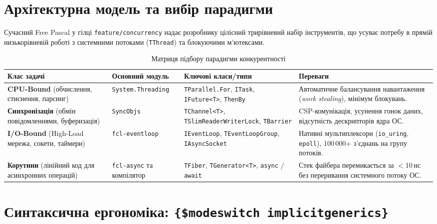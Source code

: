 \documentclass[11pt,a4paper]{article}
\begin{document}
\tableofcontents
\newpage

\section{Архітектурна модель та вибір парадигми}

Сучасний Free Pascal у гілці \texttt{feature/concurrency} надає розробнику цілісний трирівневий набір інструментів, що усуває потребу в прямій низькорівневій роботі з системними потоками (\texttt{TThread}) та блокуючими м'ютексами.

\begin{table}[h!]
\centering
\small
\begin{tabularx}{\textwidth}{p{3.2cm}p{3.5cm}p{4.2cm}X}
\toprule
\textbf{Клас задачі} & \textbf{Основний модуль} & \textbf{Ключові класи/типи} & \textbf{Переваги} \\
\midrule
\textbf{CPU-Bound} (обчислення, стиснення, парсинг) & \texttt{System.Threading} & \texttt{TParallel.For}, \texttt{ITask}, \texttt{IFuture<T>}, \texttt{ThenBy} & Автоматичне балансування навантаження (\emph{work stealing}), мінімум блокувань. \\
\addlinespace
\textbf{Синхронізація} (обмін повідомленнями, буферизація) & \texttt{SyncObjs} & \texttt{TChannel<T>}, \texttt{TSlimReaderWriterLock}, \texttt{TBarrier} & CSP-комунікація, усунення гонок даних, відсутність дескрипторів ядра ОС. \\
\addlinespace
\textbf{I/O-Bound} (High-Load мережа, сокети, таймери) & \texttt{fcl-eventloop} & \texttt{IEventLoop}, \texttt{TEventLoopGroup}, \texttt{IAsyncSocket} & Нативні мультиплексори (\texttt{io\_uring}, \texttt{epoll}), 100\,000+ з'єднань на групу потоків. \\
\addlinespace
\textbf{Корутини} (лінійний код для асинхронних операцій) & \texttt{fcl-async} та компілятор & \texttt{TFiber}, \texttt{TGenerator<T>}, \texttt{async} / \texttt{await} & Стек файбера перемикається за $<$10\,нс без переривання системного потоку ОС. \\
\bottomrule
\end{tabularx}
\caption{Матриця підбору парадигми конкурентності}
\end{table}

\newpage

\section{Синтаксична ергономіка: \texttt{\{\$modeswitch implicitgenerics\}}}
\end{document}
